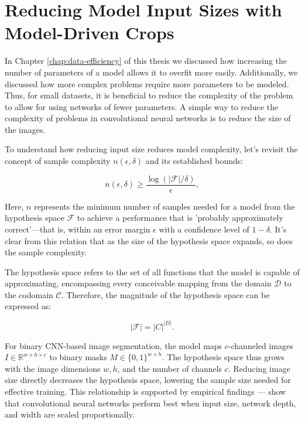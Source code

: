 
\chapter{Reducing Model Input Sizes with Model-Driven Crops}
\label{chap:reducing-input-size}

In Chapter \ref{chap:data-efficiency} of this thesis we discussed how increasing the number of parameters of a model allows it to overfit more easily. Additionally, we discussed how more complex problems require more parameters to be modeled. Thus, for small datasets, it is beneficial to reduce the complexity of the problem to allow for using networks of fewer parameters. A simple way to reduce the complexity of problems in convolutional neural networks is to reduce the size of the images.

To understand how reducing input size reduces model complexity, let's revisit the concept of sample complexity \(n(\epsilon, \delta)\) and its established bounds:

\begin{equation}
	n(\epsilon, \delta) \geq \frac{\log(\lvert \mathcal{F} \rvert / \delta)}{\epsilon},
\end{equation}

Here, \(n\) represents the minimum number of samples needed for a model from the hypothesis space \(\mathcal{F}\) to achieve a performance that is 'probably approximately correct'—that is, within an error margin \(\epsilon\) with a confidence level of \(1 - \delta\). It's clear from this relation that as the size of the hypothesis space expands, so does the sample complexity.

The hypothesis space refers to the set of all functions that the model is capable of approximating, encompassing every conceivable mapping from the domain \(\mathcal{D}\) to the codomain \(\mathcal{C}\). Therefore, the magnitude of the hypothesis space can be expressed as:

\begin{equation}
	\lvert \mathcal{F} \rvert = {\lvert C \rvert}^{\lvert D \rvert}.
\end{equation}

For binary CNN-based image segmentation, the model maps \(c\)-channeled images \(I \in \mathbb{R}^{w \times h \times c}\) to binary masks \(M \in \{0, 1\}^{w \times h}\). The hypothesis space thus grows with the image dimensions \(w, h\), and the number of channels \(c\). Reducing image size directly decreases the hypothesis space, lowering the sample size needed for effective training. This relationship is supported by empirical findings --- \citet{tanEfficientNetRethinkingModel2020} show that convolutional neural networks perform best when input size, network depth, and width are scaled proportionally.

